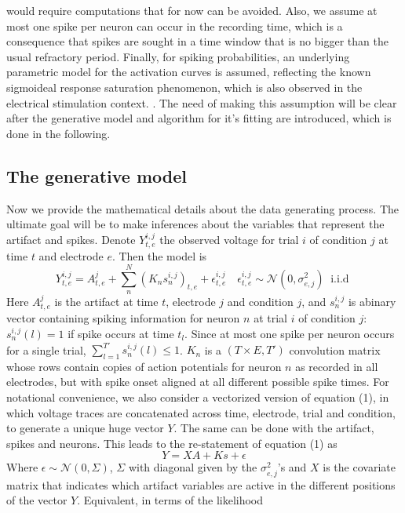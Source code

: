 \documentclass[12pt,letterpaper,fleqn]{article}
\begin{document}
\cite{EkanadhamEtal11} would require computations that for now can be avoided.  Also, we assume at most one spike per neuron can occur in the recording time, which is a consequence that spikes are sought in a time window that is no bigger than the usual refractory period. Finally, for spiking probabilities, an underlying parametric model for the activation curves is assumed, reflecting the known sigmoideal response saturation phenomenon, which is also observed in the electrical stimulation context. \cite{GrosbergEtal14}. The need of making this assumption will be clear after the generative model and algorithm for it's fitting are introduced, which is done in the following. 


\subsection{The generative model}
Now we provide the mathematical details about the data generating process. The ultimate goal will be to make inferences about the variables that represent the artifact and spikes.
 Denote $Y_{t,e}^{i,j}$ the observed voltage for trial $i$ of condition $j$ at time $t$ and electrode $e$. Then the model is
\begin{equation} Y_{t,e}^{i,j}=A_{t,e}^j+\sum_n^N (K_n s_n^{i,j})_{t,e}+\epsilon_{t,e}^{i,j}\quad\epsilon_{t,e}^{i,j} \sim \mathcal{N}\left(0,\sigma^2_{e,j}\right) \;\; \text{i.i.d }\end{equation}
Here $A_{t,e}^j$  is the artifact at time $t$, electrode $j$ and condition $j$, and $s_n^{i,j}$ is abinary vector containing spiking information for neuron $n$ at trial $i$ of condition $j$: $s_n^{i,j}(l)=1$ if spike occurs at time $t_{l}$. Since at most one spike per neuron occurs for a single trial, $ \sum_{l=1}^{T'}s_n^{i,j}(l)\leq1$. $K_n$ is a $(T\times E, T')$ convolution matrix whose rows contain copies of action potentials for neuron $n$ as recorded in all electrodes, but with spike onset aligned at all different possible spike times. For notational convenience, we also consider a vectorized version of equation (1), in which voltage traces are concatenated across time, electrode, trial and condition, to generate a unique huge vector $Y$. The same can be done with the artifact, spikes and neurons. This leads to the re-statement of equation (1) as
\begin{equation}
Y=XA+Ks+\epsilon
\end{equation}
Where $\epsilon \sim \mathcal{N}(0,\Sigma)$, $\Sigma$ with diagonal given by the $\sigma^2_{e,j}$'s  and $X$ is the covariate matrix that indicates which artifact variables are active in the different positions of the vector $Y$. Equivalent, in terms of the likelihood
\end{document}
